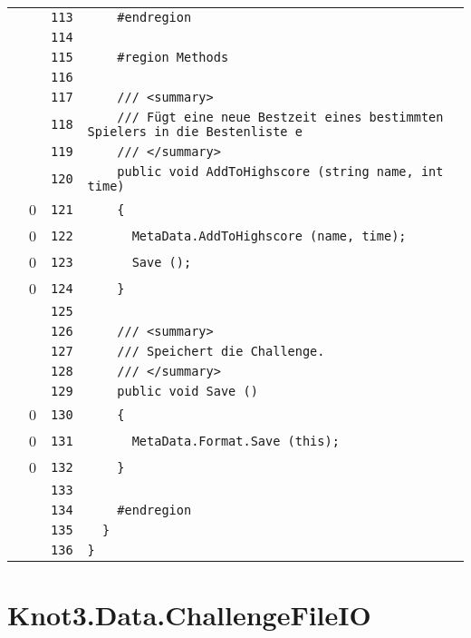 \documentclass[a4paper,10pt]{article}
\begin{document}
\begin{longtable}[l]{lrrl}
\cellcolor{gray} &  & \verb~113~ & \verb~    #endregion~\\
\cellcolor{gray} &  & \verb~114~ & \verb~~\\
\cellcolor{gray} &  & \verb~115~ & \verb~    #region Methods~\\
\cellcolor{gray} &  & \verb~116~ & \verb~~\\
\cellcolor{gray} &  & \verb~117~ & \verb~    /// <summary>~\\
\cellcolor{gray} &  & \verb~118~ & \verb~    /// Fügt eine neue Bestzeit eines bestimmten Spielers in die Bestenliste e~\\
\cellcolor{gray} &  & \verb~119~ & \verb~    /// </summary>~\\
\cellcolor{gray} &  & \verb~120~ & \verb~    public void AddToHighscore (string name, int time)~\\
\cellcolor{red} & 0 & \verb~121~ & \verb~    {~\\
\cellcolor{red} & 0 & \verb~122~ & \verb~      MetaData.AddToHighscore (name, time);~\\
\cellcolor{red} & 0 & \verb~123~ & \verb~      Save ();~\\
\cellcolor{red} & 0 & \verb~124~ & \verb~    }~\\
\cellcolor{gray} &  & \verb~125~ & \verb~~\\
\cellcolor{gray} &  & \verb~126~ & \verb~    /// <summary>~\\
\cellcolor{gray} &  & \verb~127~ & \verb~    /// Speichert die Challenge.~\\
\cellcolor{gray} &  & \verb~128~ & \verb~    /// </summary>~\\
\cellcolor{gray} &  & \verb~129~ & \verb~    public void Save ()~\\
\cellcolor{red} & 0 & \verb~130~ & \verb~    {~\\
\cellcolor{red} & 0 & \verb~131~ & \verb~      MetaData.Format.Save (this);~\\
\cellcolor{red} & 0 & \verb~132~ & \verb~    }~\\
\cellcolor{gray} &  & \verb~133~ & \verb~~\\
\cellcolor{gray} &  & \verb~134~ & \verb~    #endregion~\\
\cellcolor{gray} &  & \verb~135~ & \verb~  }~\\
\cellcolor{gray} &  & \verb~136~ & \verb~}~\\
\end{longtable}
\newpage
\section{Knot3.Data.ChallengeFileIO}
\end{document}
